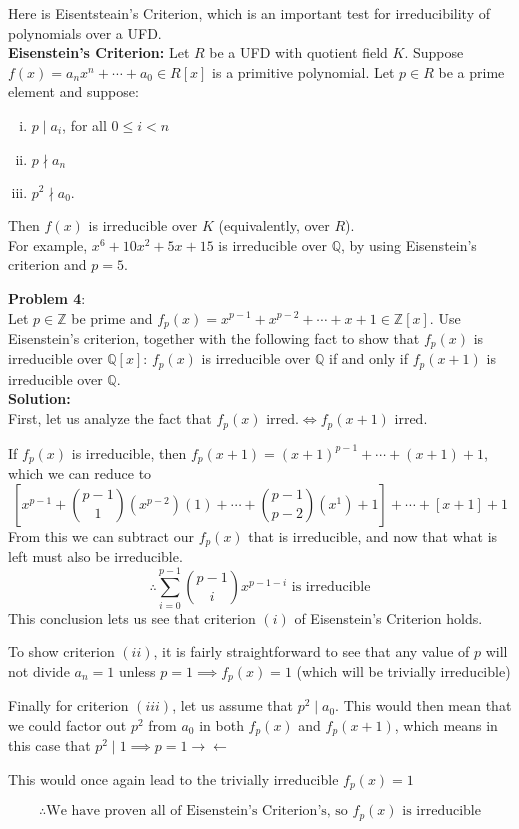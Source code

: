 \documentclass[11pt]{article}
\newcommand{\prob}[3]{\begin{flushleft}
        \textbf{Problem #1}: \\
        #2 
		\textbf{Solution:} 
		#3

\end{flushleft}}
\begin{document}
Here is Eisentsteain's Criterion, which is an important test for irreducibility of polynomials over a UFD. \\
\textbf{Eisenstein's Criterion:} Let $R$ be a UFD with quotient field $K$.
Suppose $f(x) = a_nx^n + \cdots + a_0 \in R[x]$ is a primitive polynomial.
Let $p \in R$ be a prime element and suppose:
\begin{enumerate}[(i)]
  \item $p \mid a_i$, for all $0 \leq i < n$
  \item $p \nmid a_n$
  \item $p^2 \nmid a_0$.
\end{enumerate}
Then $f(x)$ is irreducible over $K$ (equivalently, over $R$).\\
For example, $x^6 + 10x^2 + 5x + 15$ is irreducible over $\mathbb{Q}$, by using Eisenstein's criterion and $p = 5$.

\prob{4}{
Let $p \in \mathbb{Z}$ be prime and $f_p(x) = x^{p-1} + x^{p-2} + \cdots + x + 1 \in \mathbb{Z}[x]$. Use Eisenstein's criterion, together with the following fact to show that $f_p(x)$ is irreducible over $\mathbb{Q}[x]$: $f_p(x)$ is irreducible over $\mathbb{Q}$ if and only if $f_p(x + 1)$ is irreducible over $\mathbb{Q}$. \\
}{ \\
First, let us analyze the fact that $f_p(x) \text{ irred.} \iff f_p(x + 1) \text{ irred.}$

If $f_p(x)$ is irreducible, then $f_p(x + 1) = (x + 1)^{p-1} + \cdots + (x + 1) + 1$,
which we can reduce to
$$[x^{p - 1} + \binom{p-1}{1}(x^{p-2})(1) + \cdots + \binom{p-1}{p-2}(x^{1}) + 1] + \cdots + [x + 1] + 1$$
From this we can subtract our $f_p(x)$ that is irreducible, and now that what is left must also be irreducible.
$$\therefore \sum_{i=0}^{p - 1}\binom{p-1}{i}x^{p-1-i} \text{ is irreducible}$$
This conclusion lets us see that criterion $(i)$ of Eisenstein's Criterion holds.

To show criterion $(ii)$, it is fairly straightforward to see that
any value of $p$ will not divide $a_n = 1$ unless $p = 1 \implies f_p(x) = 1$ (which will be trivially irreducible)

Finally for criterion $(iii)$, let us assume that $p^2 \mid a_0$.
This would then mean that we could factor out $p^2$ from $a_0$ in both $f_p(x)$ and $f_p(x + 1)$, which means in this case that $p^2 \mid 1 \implies p = 1 \rightarrow\leftarrow$

This would once again lead to the trivially irreducible $f_p(x) = 1$

$$\therefore \text{We have proven all of Eisenstein's Criterion's, so $f_p(x)$ is irreducible}$$
}
\end{document}
